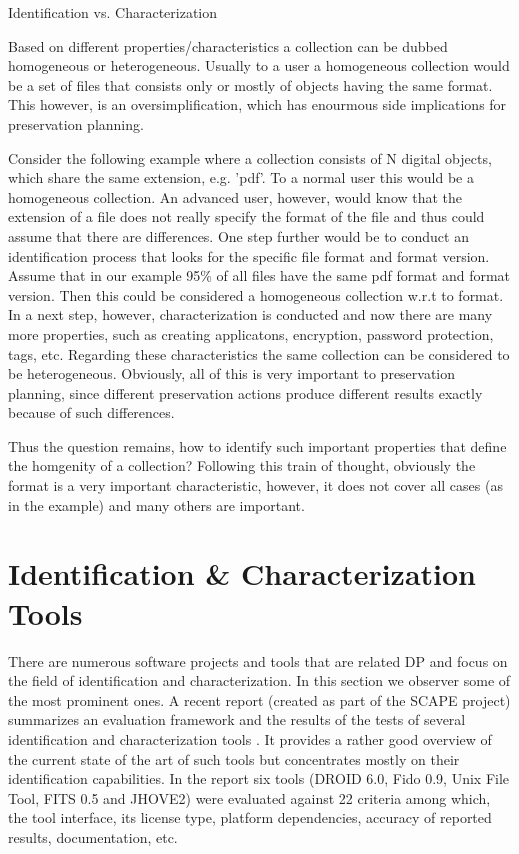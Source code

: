 Identification vs. Characterization

Based on different properties/characteristics a collection can be dubbed homogeneous or heterogeneous. Usually to a user a homogeneous collection would be a set of files that consists only or mostly of objects having the same format. This however, is an oversimplification, which has enourmous side implications for preservation planning.

Consider the following example where a collection consists of N digital objects, which share the same extension, e.g. 'pdf'. To a normal user this would be a homogeneous collection. An advanced user, however, would know that the extension of a file does not really specify the format of the file and thus could assume that there are differences.
One step further would be to conduct an identification process that looks for the specific file format and format version. Assume that in our example 95\% of all files have the same pdf format and format version.  Then this could be considered a homogeneous collection w.r.t to format. 
In a next step, however, characterization is conducted and now there are many more properties, such as creating applicatons, encryption, password protection, tags, etc.
Regarding these characteristics the same collection can be considered to be heterogeneous.
Obviously, all of this is very important to preservation planning, since different preservation actions produce different results exactly because of such differences.

Thus the question remains, how to identify such important properties that define the homgenity of a collection? Following this train of thought, obviously the format is a very important characteristic, however, it does not cover all cases (as in the example) and many others are important.




\section{Identification \& Characterization Tools}
There are numerous software projects and tools that are related DP and focus on the field of identification and characterization. In this section we observer some of the most prominent ones. A recent report (created as part of the SCAPE project) summarizes an evaluation framework and the results of the tests of several identification and characterization tools \cite{Knijff:2011it}. It provides a rather good overview of the current state of the art of such tools but concentrates mostly on their identification capabilities. In the report six tools (DROID 6.0, Fido 0.9, Unix File Tool, FITS 0.5 and JHOVE2) were evaluated against 22 criteria among which, the tool interface, its license type, platform dependencies, accuracy of reported results, documentation, etc.

